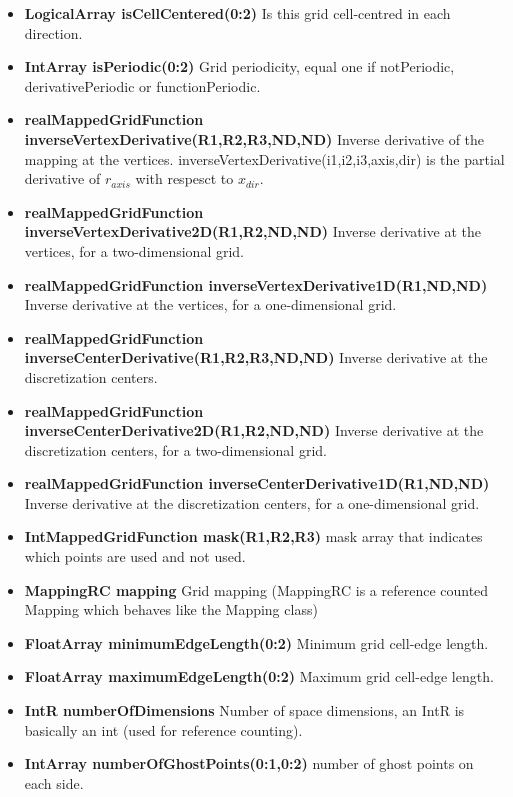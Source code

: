 \begin{itemize}
\item {\bf LogicalArray isCellCentered(0:2)}   Is this grid cell-centred in each direction.  
\item {\bf IntArray   isPeriodic(0:2)}   Grid periodicity, equal one if notPeriodic,
      derivativePeriodic or functionPeriodic.   
\item {\bf realMappedGridFunction inverseVertexDerivative(R1,R2,R3,ND,ND)} 
      Inverse derivative of the mapping at the vertices.             
      {\ff inverseVertexDerivative(i1,i2,i3,axis,dir)}
        is the partial derivative of $r_{axis}$ with respesct to $x_{dir}$.
\item {\bf realMappedGridFunction inverseVertexDerivative2D(R1,R2,ND,ND)} 
      Inverse derivative at the vertices,  for a two-dimensional grid.      
\item {\bf realMappedGridFunction inverseVertexDerivative1D(R1,ND,ND)} 
      Inverse derivative at the vertices, for a one-dimensional grid.    

\item {\bf realMappedGridFunction inverseCenterDerivative(R1,R2,R3,ND,ND)} Inverse derivative at the 
            discretization centers.
\item {\bf realMappedGridFunction inverseCenterDerivative2D(R1,R2,ND,ND)} Inverse derivative at the 
       discretization centers, for a two-dimensional grid.
\item {\bf realMappedGridFunction inverseCenterDerivative1D(R1,ND,ND)}
           Inverse derivative at the discretization centers, for a one-dimensional grid.

\item{\bf IntMappedGridFunction mask(R1,R2,R3)} mask array that indicates which points are used and not used.

\item{\bf MappingRC mapping} Grid mapping (MappingRC is a reference counted Mapping which
       behaves like the Mapping class)

\item{\bf FloatArray minimumEdgeLength(0:2)} Minimum grid cell-edge length.
\item{\bf FloatArray maximumEdgeLength(0:2)} Maximum grid cell-edge length.

\item {\bf IntR numberOfDimensions}  Number of space dimensions,
          an {\ff IntR} is basically an {\ff int} (used for reference counting).
\item {\bf IntArray   numberOfGhostPoints(0:1,0:2)}   number of ghost points on each side.


\end{itemize}
